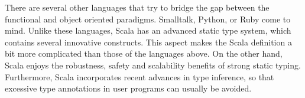 There are several other languages that try to bridge the gap between
the functional and object oriented
paradigms. Smalltalk\cite{goldberg-robson:smalltalk-language},
Python\cite{rossum:python}, or Ruby\cite{matsumtoto:ruby} come to
mind. Unlike these languages, Scala has an advanced static type
system, which contains several innovative constructs.  This aspect
makes the Scala definition a bit more complicated than those of the
languages above. On the other hand, Scala enjoys the robustness,
safety and scalability benefits of strong static typing. Furthermore,
Scala incorporates recent advances in type inference, so that
excessive type annotations in user programs can usually be avoided.



